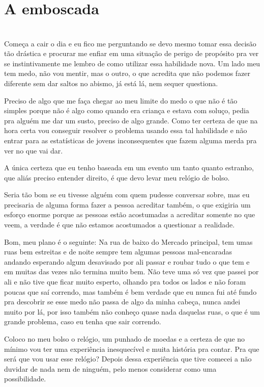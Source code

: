 

\ifdefined\useChapters
\chapter{A emboscada}
\else
\chapter{}
\fi

Começa a cair o dia e eu fico me perguntando se devo mesmo tomar essa decisão tão drástica e procurar me enfiar em uma situação de perigo de propósito pra ver se instintivamente me lembro de como utilizar essa habilidade nova. Um lado meu tem medo, não vou mentir, mas o outro, o que acredita que não podemos fazer diferente sem dar saltos no abismo, já está lá, nem sequer questiona.

Preciso de algo que me faça chegar ao meu limite do medo o que não é tão simples porque não é algo como quando era criança e estava com soluço, pedia pra alguém me dar um susto, preciso de algo grande. Como ter certeza de que na hora certa vou conseguir resolver o problema usando essa tal habilidade e não entrar para as estatísticas de jovens inconsequentes que fazem alguma merda pra ver no que vai dar.

A única certeza que eu tenho baseada em um evento um tanto quanto estranho, que aliás preciso entender direito, é que devo levar meu relógio de bolso.

Seria tão bom se eu tivesse alguém com quem pudesse conversar sobre, mas eu precisaria de alguma forma fazer a pessoa acreditar também, o que exigiria um esforço enorme porque as pessoas estão acostumadas a acreditar somente no que veem, a verdade é que não estamos acostumados a questionar a realidade.

Bom, meu plano é o seguinte: Na rua de baixo do Mercado principal, tem umas ruas bem estreitas e de noite sempre tem algumas pessoas mal-encaradas andando esperando algum desavisado por ali passar e roubar tudo o que tem e em muitas das vezes não termina muito bem. Não teve uma só vez que passei por ali e não tive que ficar muito esperto, olhando pra todos os lados e não foram poucas que saí correndo, mas também é bem verdade que eu nunca fui até fundo pra descobrir se esse medo não passa de algo da minha cabeça, nunca andei muito por lá, por isso também não conheço quase nada daquelas ruas, o que é um grande problema, caso eu tenha que sair correndo.

Coloco no meu bolso o relógio, um punhado de moedas e a certeza de que no mínimo vou ter uma experiência inesquecível e muita história pra contar. Pra que será que vou usar esse relógio? Depois dessa experiência que tive comecei a não duvidar de nada nem de ninguém, pelo menos considerar como uma possibilidade.

